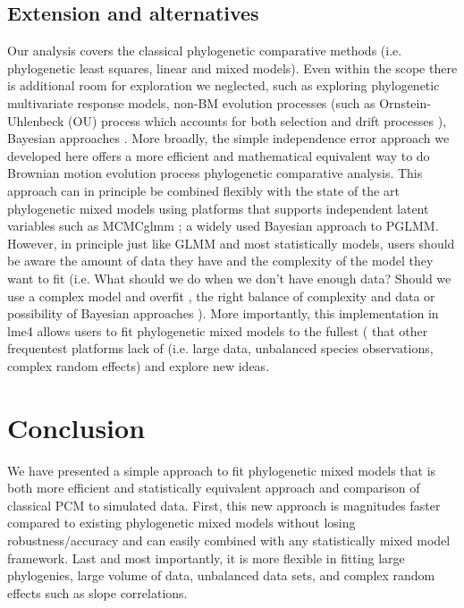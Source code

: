 \subsection{Extension and alternatives}

Our analysis covers the classical phylogenetic comparative methods (i.e. phylogenetic least squares, linear and mixed models).
Even within the scope there is additional room for exploration we neglected, such as exploring phylogenetic multivariate response models, non-BM evolution processes (such as Ornstein-Uhlenbeck (OU) process which accounts for both selection and drift processes \cite{butler2004phylogenetic}), Bayesian approaches \cite{hadfield2010general}.
More broadly, the simple independence error approach we developed here offers a more efficient and mathematical equivalent way to do Brownian motion evolution process phylogenetic comparative analysis. 
This approach can in principle be combined flexibly with the state of the art phylogenetic mixed models using platforms that supports independent latent variables such as MCMCglmm \cite{hadfield2010mcmc}; a widely used Bayesian approach to PGLMM.
However, in principle just like GLMM and most statistically models, users should be aware the amount of data they have and the complexity of the model they want to fit (i.e. What should we do when we don't have enough data? Should we use a complex model and overfit \cite{barr2013random}, the right balance of complexity and data \cite{baayen2008mixed} or possibility of Bayesian approaches \cite{hadfield2010mcmc}).
More importantly, this implementation in lme4 allows users to fit phylogenetic mixed models to the fullest ( that other frequentest platforms lack of (i.e. large data, unbalanced species observations, complex random effects) and explore new ideas.


\section{Conclusion}

We have presented a simple approach to fit phylogenetic mixed models that is both more efficient and statistically equivalent approach and comparison of classical PCM to simulated data. 
First, this new approach is magnitudes faster compared to existing phylogenetic mixed models without losing robustness/accuracy and can easily combined with any statistically mixed model framework. 
Last and most importantly, it is more flexible in fitting large phylogenies, large volume of data, unbalanced data sets, and complex random effects such as slope correlations.



